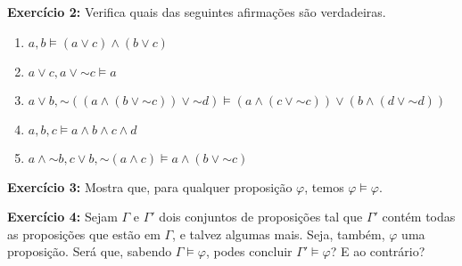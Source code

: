 \documentclass{article}
\theoremstyle{definition}
\theoremstyle{remark}
\newcommand*{\lneg}{\mathord{\sim}}
\begin{document}
	\bigskip
		
	\textbf{Exercício 2:} Verifica quais das seguintes afirmações são verdadeiras.
	
	\begin{enumerate}
	\item $a, b \vDash (a \lor c) \land (b \lor c)$
	
	\item $a \lor c, a \lor \lneg c \vDash a$
	
	\item $a \lor b, \lneg( (a \land (b \lor \lneg c)) \lor \lneg d) \vDash (a \land (c \lor \lneg c)) \lor (b \land (d \lor \lneg d))$
	
	\item $a, b, c \vDash a \land b \land c \land d$
	
	\item $a \land \lneg b, c \lor b, \lneg(a \land c) \vDash a \land (b \lor \lneg c)$
	\end{enumerate}
	
	\textbf{Exercício 3:} Mostra que, para qualquer proposição $\varphi$, temos $\varphi \vDash \varphi$.
	
	\smallskip
	
	\textbf{Exercício 4:} Sejam $\Gamma$ e $\Gamma'$ dois conjuntos de proposições tal que $\Gamma'$ contém todas as proposições que estão em $\Gamma$, e talvez algumas mais. Seja, também, $\varphi$ uma proposição. Será que, sabendo $\Gamma \vDash \varphi$, podes concluir $\Gamma' \vDash \varphi$? E ao contrário?

	\smallskip
	
	
\end{document}
